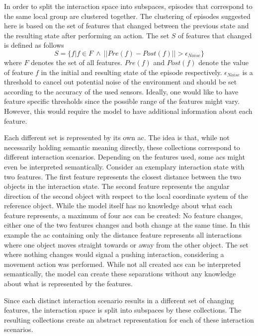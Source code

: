 In order to split the interaction space into subspaces, episodes that correspond to the same local group are clustered together.
The clustering of episodes suggested here is based on the set of features that changed between the previous state and the resulting state after performing an action. The set $S$ of features that changed is defined as follows 
\begin{equation}
S = \{f | f \in F ~ \wedge ~ ||Pre(f)-Post(f)|| > \epsilon_{Noise}\}
\label{eq:difSet}
\end{equation}
where $F$ denotes the set of all features. $Pre(f)$ and $Post(f)$ denote the value of 
feature $f$ in the initial and resulting state of the episode respectively. $\epsilon_{Noise}$ is a threshold to cancel out potential noise of the environment and should be set according to the accuracy of the used sensors. Ideally, one would like to have feature specific thresholds since the possible range of the features might vary. However, this would require the model to have additional information about each feature.

Each different set is represented by its own \acrlong{ac}. The 
idea is that, while not necessarily holding semantic meaning directly, these collections correspond to different interaction scenarios. Depending on the features used, some \glspl{ac} might even be interpreted semantically.
Consider an exemplary interaction state with two features. The first feature represents the closest distance between the two objects in the interaction state. The second feature represents the angular direction of the second object with respect to the local coordinate system of the reference object. While the model itself has no knowledge about what each feature represents, a maximum of four \glspl{ac} can be created: No feature changes, either one of the two features changes and both change at the same time. In this example the \gls{ac} containing only the distance feature represents all interactions where one object moves straight towards or away from the other object. The set where nothing changes would signal a pushing interaction, considering a movement action was performed. While not all created \glspl{ac} can be interpreted semantically, the model can create these separations without any knowledge about what is represented by the features.

Since each distinct interaction scenario results in a different set of changing features, the interaction space is split into subspaces by these collections. The resulting collections create an abstract representation for each of these interaction scenarios. 

